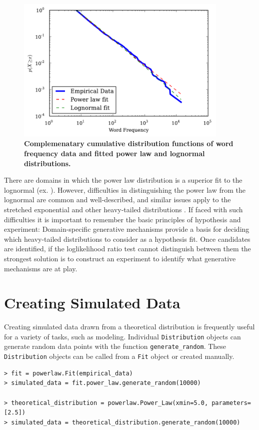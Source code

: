 \documentclass[10pt]{article}
\begin{document}
\begin{figure}[!ht]
\begin{center}
\includegraphics[width=4in]{FigLognormal.pdf}
\end{center}
\caption{
{\bf Complemenatary cumulative distribution functions of word frequency data and fitted power law and lognormal distributions.}
}
\label{Lognormal}
\end{figure}

There are domains in which the power law distribution is a superior fit to the lognormal (ex. \cite{Klaus2011}). However, difficulties in distinguishing the power law from the lognormal are common and well-described, and similar issues apply to the stretched exponential and other heavy-tailed distributions \cite{Malevergne2009, Malevergne2005,Mitzenmacher2004}. If faced with such difficulties it is important to remember the basic principles of hypothesis and experiment: Domain-specific generative mechanisms provide a basis for deciding which heavy-tailed distributions to consider as a hypothesis fit. Once candidates are identified, if the loglikelihood ratio test cannot distinguish between them the strongest solution is to construct an experiment to identify what generative mechanisms are at play. 

\section*{Creating Simulated Data}
Creating simulated data drawn from a theoretical distribution is frequently useful for a variety of tasks, such as modeling. Individual \verb$Distribution$ objects can generate random data points with the function \verb$generate_random$. These \verb$Distribution$ objects can be called from a \verb$Fit$ object or created manually.

\begin{verbatim}
> fit = powerlaw.Fit(empirical_data)
> simulated_data = fit.power_law.generate_random(10000)

> theoretical_distribution = powerlaw.Power_Law(xmin=5.0, parameters=[2.5])
> simulated_data = theoretical_distribution.generate_random(10000)
\end{verbatim}
\end{document}
